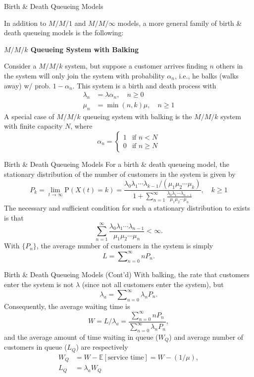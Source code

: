\documentclass[letterpaper,handout]{beamer}
\def\Sum{\sum\nolimits}
\def\p{\mathrm P}
\def\E{\mathbb E}
\begin{document}
\begin{frame}{Birth \& Death Queueing Models}

In addition to $M/M/1$ and $M/M/\infty$ models, a more general family of birth \& death queueing models is the following:\medskip


\textbf{$M/M/k$ Queueing System with Balking}

Consider a $M/M/k$ system, but suppose a customer arrives finding $n$ others in the system will only join the system with probability $\alpha_n$, i.e., he balks (walks away) w/ prob. $1-\alpha_n$. This system is a birth and death process with
\begin{align*}
\lambda_n&=\lambda\alpha_n,\quad n\ge 0\\
\mu_n&=\min(n,k)\mu,\quad n\ge 1
\end{align*}
A special case of $M/M/k$ queueing system with balking is the $M/M/k$ system with finite capacity $N$, where
$$
\alpha_n=
\begin{cases}
1 & \text{if } n< N\\
0 & \text{if } n\ge N
\end{cases}
$$
\end{frame}
\begin{frame}{Birth \& Death Queueing Models}
For a birth \& death queueing model,
the stationary distribution of the number of customers in the system is given by
$$
P_k=\lim_{t\to\infty}\p(X(t)=k)=\frac{\lambda_{0}\lambda_{1}\cdots\lambda_{k-1}/(\mu_{1}\mu_{2}\cdots\mu_{k})}{1+\sum_{n=1}^{\infty}\frac{\lambda_{0}\lambda_{1}\cdots\lambda_{n-1}}{\mu_{1}\mu_{2}\cdots\mu_{n}}},\quad k\ge 1
$$
The necessary and sufficient condition for such a stationary distribution to exists is that
$$
\sum_{n=1}^{\infty}\frac{\lambda_{0}\lambda_{1}\cdots\lambda_{n-1}}{\mu_{1}\mu_{2}\cdots\mu_{n}}< \infty.
$$
With $\{P_n\}$, the average number of customers in the system is simply
$$L=\Sum_{n=0}^{\infty} n P_n.$$
\end{frame}
\begin{frame}{Birth \& Death Queueing Models (Cont'd)}
With balking, the rate that customers enter the system is not $\lambda$ (since not all customers enter the system), but
$$\lambda_a=\Sum_{n=0}^{\infty} \lambda_n P_n.$$
Consequently, the average waiting time is
$$W=L/\lambda_a=\frac{\Sum_{n=0}^{\infty} n P_n}{\Sum_{n=0}^{\infty} \lambda_n P_n},$$
and the average amount of time waiting in queue ($W_Q$) and average number of customers in queue ($L_Q$) are respectively
\begin{align*}
W_Q &= W - \E[\text{service time}]=W-(1/\mu),\\
L_Q &=\lambda_a W_Q
\end{align*}
\end{frame}
\end{document}
